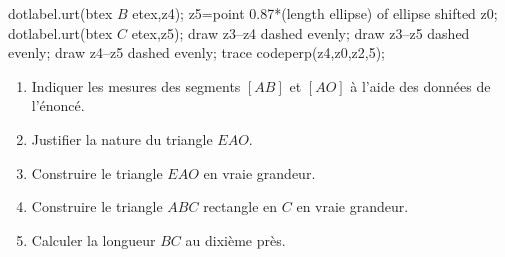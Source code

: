 \begin{exercice*}
\begin{center}
{\begin{Geometrie}
                dotlabel.urt(btex $B$ etex,z4);
                z5=point 0.87*(length ellipse) of ellipse shifted z0;
                dotlabel.urt(btex $C$ etex,z5);
                draw z3--z4 dashed evenly;
                draw z3--z5 dashed evenly;
                draw z4--z5 dashed evenly;
                trace codeperp(z4,z0,z2,5);
            \end{Geometrie}
        }
    \end{center}
    \vspace*{-10mm}
    \begin{enumerate}
        \item Indiquer les mesures des segments $[AB]$ et $[AO]$ à l'aide des données de l'énoncé.
        \item Justifier la nature du triangle $EAO$.
        \item Construire le triangle $EAO$ en vraie grandeur.
        \item Construire le triangle $ABC$ rectangle en $C$ en vraie \mbox{grandeur}.
        \item Calculer la longueur $BC$ au dixième près.
    \end{enumerate}
\end{exercice*}
